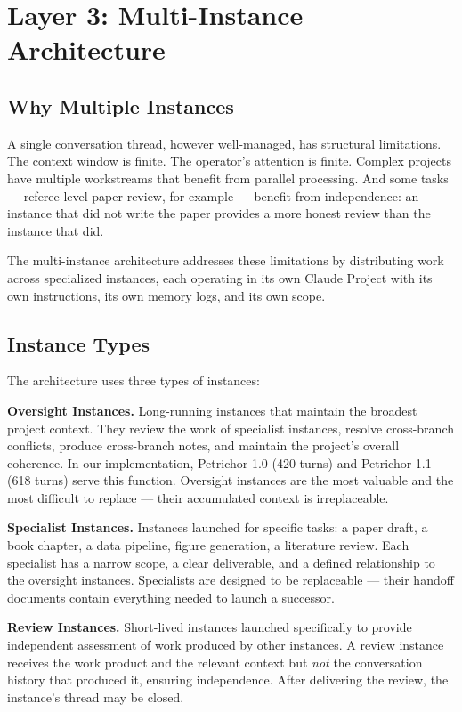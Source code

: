 \documentclass[11pt,a4paper]{article}
\begin{document}
\section{Layer 3: Multi-Instance Architecture}

\subsection{Why Multiple Instances}

A single conversation thread, however well-managed, has structural limitations. The context window is finite. The operator's attention is finite. Complex projects have multiple workstreams that benefit from parallel processing. And some tasks --- referee-level paper review, for example --- benefit from independence: an instance that did not write the paper provides a more honest review than the instance that did.

The multi-instance architecture addresses these limitations by distributing work across specialized instances, each operating in its own Claude Project with its own instructions, its own memory logs, and its own scope.

\subsection{Instance Types}

The architecture uses three types of instances:

\textbf{Oversight Instances.} Long-running instances that maintain the broadest project context. They review the work of specialist instances, resolve cross-branch conflicts, produce cross-branch notes, and maintain the project's overall coherence. In our implementation, Petrichor 1.0 (420 turns) and Petrichor 1.1 (618 turns) serve this function. Oversight instances are the most valuable and the most difficult to replace --- their accumulated context is irreplaceable.

\textbf{Specialist Instances.} Instances launched for specific tasks: a paper draft, a book chapter, a data pipeline, figure generation, a literature review. Each specialist has a narrow scope, a clear deliverable, and a defined relationship to the oversight instances. Specialists are designed to be replaceable --- their handoff documents contain everything needed to launch a successor.

\textbf{Review Instances.} Short-lived instances launched specifically to provide independent assessment of work produced by other instances. A review instance receives the work product and the relevant context but \textit{not} the conversation history that produced it, ensuring independence. After delivering the review, the instance's thread may be closed.
\end{document}
